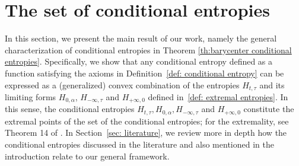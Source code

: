 \documentclass[aps,pra,11pt,onecolumn,nofootinbib,tightenlines]{revtex4-2}
\theoremstyle{definition}
\begin{document}
 \section{The set of conditional entropies}
\label{sec: set of conditional entropies}
In this section, we present the main result of our work, namely the general characterization of conditional entropies in Theorem \ref{th:barycenter conditional entropies}. Specifically, we show that any conditional entropy defined as a function satisfying the axioms in Definition~\ref{def: conditional entropy} can be expressed as a (generalized) convex combination of the entropies $H_{t,\tau}$ and its limiting forms $H_{0,\alpha}$, $H_{-\infty,\tau}$ and $H_{+\infty,0}$ defined in~\ref{def: extremal entropies}. In this sense, the conditional entropies $H_{t,\tau},H_{0,\alpha},H_{-\infty,\tau}$ and $H_{+\infty,0}$ constitute the extremal points of the set of the conditional entropies; for the extremality, see Theorem 14 of \cite{haapasalo_inprep}. In Section~\ref{sec: literature}, we review more in depth how the conditional entropies discussed in the literature and also mentioned in the introduction relate to our general framework.






\end{document}
